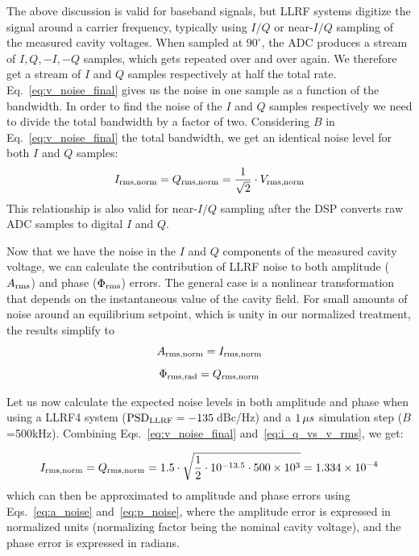 \documentclass[a4paper,12pt]{article}
\begin{document}
The above discussion is valid for baseband signals, but LLRF systems digitize the signal
around a carrier frequency, typically using $I/Q$ or near-$I/Q$ sampling of the measured cavity voltages. When sampled at $90^\circ$, the ADC produces a stream of $I, Q, -I, -Q$ samples, which gets repeated over and over again. We therefore get a stream of $I$ and $Q$ samples respectively at half the total rate. Eq.~\eqref{eq:v_noise_final} gives us the noise in one sample as a function of the bandwidth. In order to find the noise of the $I$ and $Q$ samples respectively we need to divide the total bandwidth by a factor of two. Considering $B$ in Eq.~\eqref{eq:v_noise_final} the total bandwidth, we get an identical noise level for both $I$ and $Q$ samples:
\begin{equation}
  I_{\rm rms,norm}= Q_{\rm rms,norm} = \frac{1}{\sqrt{2}}\cdot V_{\rm rms,norm}
  \label{eq:i_q_vs_v_rms}
\end{equation}
This relationship is also valid for near-$I/Q$ sampling after the DSP converts raw ADC samples to digital
$I$ and $Q$.

Now that we have the noise in the $I$ and $Q$ components of the measured cavity voltage, we can calculate the contribution of LLRF noise to both amplitude ($A_{\rm rms}$) and phase ($\Phi_{\rm rms}$) errors.
The general case is a nonlinear transformation that depends on the instantaneous value of the cavity field.
For small amounts of noise around an equilibrium setpoint, which is unity in our normalized treatment,
the results simplify to
\begin{equation}
  A_{\rm rms,norm} = I_{\rm rms,norm}
  \label{eq:a_noise}
\end{equation}
\begin{equation}
  \Phi_{\rm rms,rad} = Q_{\rm rms,norm}
  \label{eq:p_noise}
\end{equation}

Let us now calculate the expected noise levels in both amplitude and phase when using a LLRF4 system (${\rm PSD}_{\rm LLRF}=-135\thinspace$dBc/Hz) and a $1\thinspace\mu s$ simulation step ($B$=500\thinspace kHz). Combining Eqs.~\eqref{eq:v_noise_final} and~\ref{eq:i_q_vs_v_rms}, we get:

\begin{equation}
   I_{\rm rms,norm} = Q_{\rm rms,norm} =  1.5 \cdot \sqrt{\frac{1}{2} \cdot 10^{-13.5} \cdot 500 \times 10^3}= 1.334\times 10^{-4}
\end{equation}
which can then be approximated to amplitude and phase errors using Eqs.~\eqref{eq:a_noise} and~\eqref{eq:p_noise}, where the amplitude error is expressed in normalized units (normalizing factor being the nominal cavity voltage), and the phase error is expressed in radians.
\end{document}
